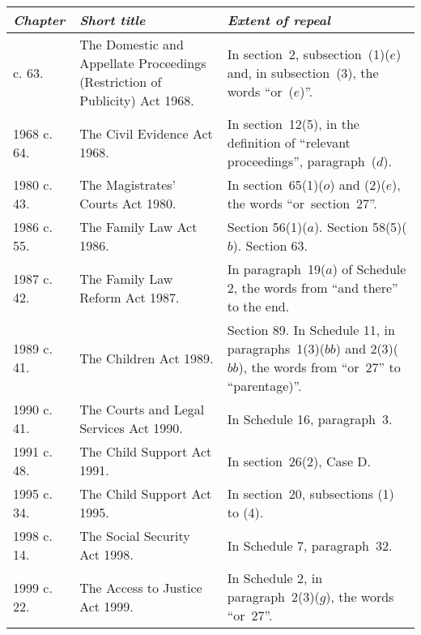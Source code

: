 \documentclass[12pt,a4paper]{article}
\begin{document}
{\footnotesize
\begin{longtable}{p{43.5645pt}p{132.50633pt}p{177.92844pt}}
\hline
\itshape Chapter	&\itshape Short title	&\itshape Extent of repeal\\
\hline
\endhead
\hline
\endlastfoot
1968 c. 63. 	&The Domestic and Appellate Proceedings (Restriction of Publicity) Act 1968. 	&In section~2, subsection~(1)($e$)  and, in subsection~(3), the words “or~($e$)”.\\
1968 c. 64. 	&The Civil Evidence Act 1968. 	&In section~12(5), in the definition of “relevant proceedings”, paragraph~($d$).\\
1980 c. 43. 	&The Magistrates' Courts Act 1980. 	&In section~65(1)($o$)  and (2)($e$), the words “or~section~27”.\\
1986 c. 55. 	&The Family Law Act 1986. 	&Section 56(1)($a$).\newline
		Section 58(5)($b$).\newline
		Section 63. \\
1987 c. 42. 	&The Family Law Reform Act 1987. 	&In paragraph~19($a$)  of Schedule 2, the words from “and there” to the end.\\
1989 c. 41. 	&The Children Act 1989. 	&Section 89. \newline
		In Schedule 11, in paragraphs~1(3)($bb$)  and 2(3)($bb$), the words from “or~27” to “parentage)”.\\
1990 c. 41. 	&The Courts and Legal Services Act 1990. 	&In Schedule 16, paragraph~3. \\
1991 c. 48. 	&The Child Support Act 1991. 	&In section~26(2), Case D.\\
1995 c. 34. 	&The Child Support Act 1995. 	&In section~20, subsections (1)  to (4).\\
1998 c. 14. 	&The Social Security Act 1998. 	&In Schedule 7, paragraph~32. \\
1999 c. 22. 	&The Access to Justice Act 1999. 	&In Schedule 2, in paragraph~2(3)($g$), the words “or~27”.\\
\end{longtable}

}
\end{document}
